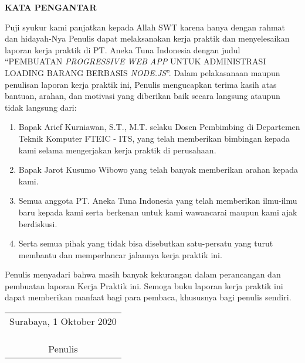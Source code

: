 \begin{center}
  \Large\textbf{KATA PENGANTAR}
\end{center}
\vspace{2ex}


\setlength{\parindent}{7ex}


Puji syukur kami panjatkan kepada Allah SWT karena hanya dengan rahmat dan hidayah-Nya Penulis dapat melaksanakan kerja praktik dan menyelesaikan laporan kerja praktik di PT. Aneka Tuna Indonesia dengan judul “PEMBUATAN \emph{PROGRESSIVE WEB APP} UNTUK ADMINISTRASI LOADING BARANG BERBASIS \emph{NODE.JS}”.
Dalam pelakasanaan maupun penulisan laporan kerja praktik ini, Penulis mengucapkan terima kasih atas bantuan, arahan, dan motivasi yang diberikan baik secara langsung ataupun tidak langsung dari:
\vspace{0.5ex}

\begin{enumerate}[nolistsep]

  \item Bapak Arief Kurniawan, S.T., M.T. selaku Dosen Pembimbing di Departemen Teknik Komputer FTEIC - ITS, yang telah memberikan bimbingan kepada kami selama mengerjakan kerja praktik di perusahaan.
  \vspace{0.5ex}

  \item Bapak Jarot Kusumo Wibowo yang telah banyak memberikan arahan kepada kami.
  \vspace{0.5ex}

  \item Semua anggota PT. Aneka Tuna Indonesia yang telah memberikan ilmu-ilmu baru kepada kami serta berkenan untuk kami wawancarai maupun kami ajak berdiskusi.
  \vspace{0.5ex}

  \item Serta semua pihak yang tidak bisa disebutkan satu-persatu yang turut membantu dan memperlancar jalannya kerja praktik ini.
  \vspace{0.5ex}

\end{enumerate}
\vspace{0.5ex}

Penulis menyadari bahwa masih banyak kekurangan dalam perancangan dan pembuatan laporan Kerja Praktik ini.
Semoga buku laporan kerja praktik ini dapat memberikan manfaat bagi para pembaca, khususnya bagi penulis sendiri.
\vspace{2ex}

\begin{flushright}
  \begin{tabular}[b]{c}
    Surabaya, 1 Oktober 2020
    \\
    \\
    \\
    \\
    Penulis
  \end{tabular}
\end{flushright}
